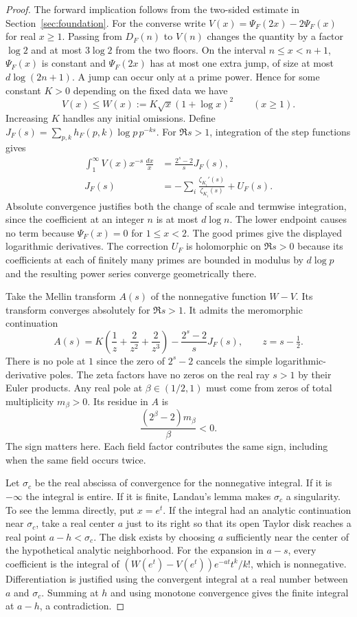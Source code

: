 \begin{proof}
The forward implication follows from the two-sided estimate in Section~\ref{sec:foundation}. For the converse write $V(x)=\Psi_F(2x)-2\Psi_F(x)$ for real $x\ge1$. Passing from $D_F(n)$ to $V(n)$ changes the quantity by a factor $\log 2$ and at most $3\log 2$ from the two floors. On the interval $n\le x<n+1$, $\Psi_F(x)$ is constant and $\Psi_F(2x)$ has at most one extra jump, of size at most $d\log(2n+1)$. A jump can occur only at a prime power. Hence for some constant $K>0$ depending on the fixed data we have
\[
     V(x)\le W(x):=K\sqrt{x}(1+\log x)^2\qquad(x\ge1).
\]
Increasing $K$ handles any initial omissions. Define $J_F(s)=\sum_{p,k} h_F(p,k)\log p\, p^{-ks}$. For $\Re s>1$, integration of the step functions gives
\begin{align*}
 \int_1^\infty V(x)x^{-s}\,\frac{dx}{x}&=\frac{2^s-2}{s}J_F(s),\\
 J_F(s)&=-\sum_i\frac{\zeta_{K_i}'(s)}{\zeta_{K_i}(s)}+U_F(s).
\end{align*}
Absolute convergence justifies both the change of scale and termwise integration, since the coefficient at an integer $n$ is at most $d\log n$. The lower endpoint causes no term because $\Psi_F(x)=0$ for $1\le x<2$. The good primes give the displayed logarithmic derivatives. The correction $U_F$ is holomorphic on $\Re s>0$ because its coefficients at each of finitely many primes are bounded in modulus by $d\log p$ and the resulting power series converge geometrically there.

Take the Mellin transform $A(s)$ of the nonnegative function $W-V$. Its transform converges absolutely for $\Re s>1$. It admits the meromorphic continuation
\[
 A(s)=K\left(\frac1z+\frac2{z^2}+\frac2{z^3}\right)
      -\frac{2^s-2}{s}J_F(s),\qquad z=s-\tfrac12.
\]
There is no pole at $1$ since the zero of $2^s-2$ cancels the simple logarithmic-derivative poles. The zeta factors have no zeros on the real ray $s>1$ by their Euler products. Any real pole at $\beta\in(1/2,1)$ must come from zeros of total multiplicity $m_\beta>0$. Its residue in $A$ is
\[
                   \frac{(2^\beta-2)m_\beta}{\beta}<0.
\]
The sign matters here. Each field factor contributes the same sign, including when the same field occurs twice.

Let $\sigma_c$ be the real abscissa of convergence for the nonnegative integral. If it is $-\infty$ the integral is entire. If it is finite, Landau's lemma makes $\sigma_c$ a singularity. To see the lemma directly, put $x=e^t$. If the integral had an analytic continuation near $\sigma_c$, take a real center $a$ just to its right so that its open Taylor disk reaches a real point $a-h<\sigma_c$. The disk exists by choosing $a$ sufficiently near the center of the hypothetical analytic neighborhood. For the expansion in $a-s$, every coefficient is the integral of $(W(e^t)-V(e^t))e^{-at}t^k/k!$, which is nonnegative. Differentiation is justified using the convergent integral at a real number between $a$ and $\sigma_c$. Summing at $h$ and using monotone convergence gives the finite integral at $a-h$, a contradiction.


\end{proof}
